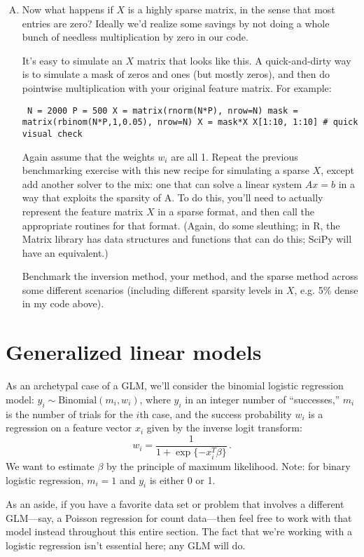 \documentclass{mynotes}
\begin{document}
\begin{enumerate}[(A)]
\item Now what happens if $X$ is a highly sparse matrix, in the sense that most
entries are zero? Ideally we'd realize some savings by not doing a whole bunch
of needless multiplication by zero in our code.

It's easy to simulate an $X$ matrix that looks like this. A quick-and-dirty way
is to simulate a mask of zeros and ones (but mostly zeros), and then do
pointwise multiplication with your original feature matrix. For example:
\begin{verbatim} N = 2000 P = 500 X = matrix(rnorm(N*P), nrow=N) mask =
matrix(rbinom(N*P,1,0.05), nrow=N) X = mask*X X[1:10, 1:10] # quick visual check
\end{verbatim}

Again assume that the weights $w_i$ are all 1. Repeat the previous benchmarking
exercise with this new recipe for simulating a sparse $X$, except add another
solver to the mix: one that can solve a linear system $Ax = b$ in a way that
exploits the sparsity of A. To do this, you'll need to actually represent the
feature matrix $X$ in a sparse format, and then call the appropriate routines
for that format. (Again, do some sleuthing; in R, the Matrix library has data
structures and functions that can do this; SciPy will have an equivalent.)

Benchmark the inversion method, your method, and the sparse method across some
different scenarios (including different sparsity levels in $X$, e.g. 5\% dense
in my code above).
\end{enumerate}


\section{Generalized linear models}

As an archetypal case of a GLM, we'll consider the binomial logistic regression
model: $y_i \sim \mbox{Binomial}(m_i, w_i)$, where $y_i$ in an integer number of
``successes,'' $m_i$ is the number of trials for the $i$th case, and the success
probability $w_i$ is a regression on a feature vector $x_i$ given by the inverse
logit transform:
$$
w_i = \frac{1}{1 + \exp\{-x_i^T \beta\}} \, .
$$
We want to estimate $\beta$ by the principle of maximum likelihood. Note: for
binary logistic regression, $m_i = 1$ and $y_i$ is either 0 or 1.

As an aside, if you have a favorite data set or problem that involves a
different GLM---say, a Poisson regression for count data---then feel free to
work with that model instead throughout this entire section. The fact that we're
working with a logistic regression isn't essential here; any GLM will do.
\end{document}
